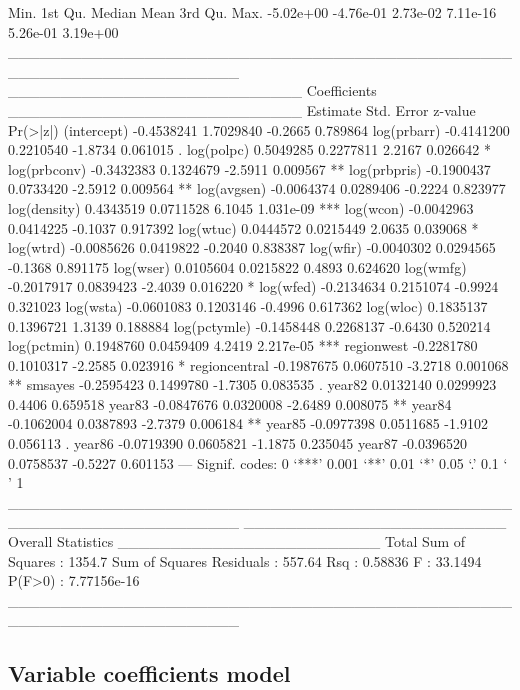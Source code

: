 \documentclass{article}
\begin{document}
\begin{Schunk}
\begin{Soutput}
     Min.   1st Qu.    Median      Mean   3rd Qu.      Max. 
-5.02e+00 -4.76e-01  2.73e-02  7.11e-16  5.26e-01  3.19e+00 
______________________________________________________________________ 
____________________________ Coefficients ____________________________
                Estimate Std. Error z-value  Pr(>|z|)    
(intercept)   -0.4538241  1.7029840 -0.2665  0.789864    
log(prbarr)   -0.4141200  0.2210540 -1.8734  0.061015 .  
log(polpc)     0.5049285  0.2277811  2.2167  0.026642 *  
log(prbconv)  -0.3432383  0.1324679 -2.5911  0.009567 ** 
log(prbpris)  -0.1900437  0.0733420 -2.5912  0.009564 ** 
log(avgsen)   -0.0064374  0.0289406 -0.2224  0.823977    
log(density)   0.4343519  0.0711528  6.1045 1.031e-09 ***
log(wcon)     -0.0042963  0.0414225 -0.1037  0.917392    
log(wtuc)      0.0444572  0.0215449  2.0635  0.039068 *  
log(wtrd)     -0.0085626  0.0419822 -0.2040  0.838387    
log(wfir)     -0.0040302  0.0294565 -0.1368  0.891175    
log(wser)      0.0105604  0.0215822  0.4893  0.624620    
log(wmfg)     -0.2017917  0.0839423 -2.4039  0.016220 *  
log(wfed)     -0.2134634  0.2151074 -0.9924  0.321023    
log(wsta)     -0.0601083  0.1203146 -0.4996  0.617362    
log(wloc)      0.1835137  0.1396721  1.3139  0.188884    
log(pctymle)  -0.1458448  0.2268137 -0.6430  0.520214    
log(pctmin)    0.1948760  0.0459409  4.2419 2.217e-05 ***
regionwest    -0.2281780  0.1010317 -2.2585  0.023916 *  
regioncentral -0.1987675  0.0607510 -3.2718  0.001068 ** 
smsayes       -0.2595423  0.1499780 -1.7305  0.083535 .  
year82         0.0132140  0.0299923  0.4406  0.659518    
year83        -0.0847676  0.0320008 -2.6489  0.008075 ** 
year84        -0.1062004  0.0387893 -2.7379  0.006184 ** 
year85        -0.0977398  0.0511685 -1.9102  0.056113 .  
year86        -0.0719390  0.0605821 -1.1875  0.235045    
year87        -0.0396520  0.0758537 -0.5227  0.601153    
---
Signif. codes:  0 ‘***’ 0.001 ‘**’ 0.01 ‘*’ 0.05 ‘.’ 0.1 ‘ ’ 1 
______________________________________________________________________ 
_________________________ Overall Statistics _________________________
Total Sum of Squares       : 1354.7
Sum of Squares Residuals   : 557.64
Rsq                        : 0.58836
F                          : 33.1494
P(F>0)                     : 7.77156e-16
______________________________________________________________________ 
\end{Soutput}
\end{Schunk}


\subsection{Variable coefficients model}
\end{document}
